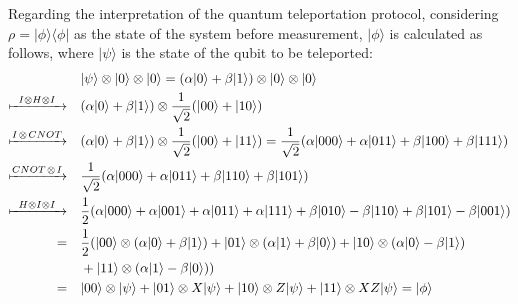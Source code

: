 Regarding the interpretation of the quantum teleportation protocol, considering $\rho = |\phi\rangle \langle \phi|$ as the state of the system before measurement, $|\phi\rangle$  is calculated as follows, where $|\psi\rangle$ is the state of the qubit to be teleported:
\begin{equation}  \label{eq:teleport_1}
  \begin{split}
&  |\psi\rangle \otimes |0\rangle \otimes |0\rangle = ( \alpha|0\rangle + \beta|1\rangle) \otimes |0\rangle \otimes |0\rangle  \\
\xmapsto{ \hspace{5pt} I\otimes H \otimes I  \hspace{5pt}} \quad &  ( \alpha|0\rangle + \beta|1\rangle) \otimes \frac{1}{\sqrt{2}} (|00\rangle + |10\rangle )  \\
\xmapsto{I \hspace{1pt} \otimes \hspace{1pt} CNOT} \quad & ( \alpha|0\rangle + \beta|1\rangle) \otimes \frac{1}{\sqrt{2}} (|00\rangle + |11\rangle ) = \frac{1}{\sqrt{2}} (\alpha|000\rangle + \alpha|011\rangle + \beta|100\rangle + \beta|111\rangle)\\
\xmapsto{ CNOT \hspace{1pt} \otimes \hspace{1pt} I } \quad &  \frac{1}{\sqrt{2}} (\alpha|000\rangle + \alpha|011\rangle + \beta|110\rangle + \beta|101\rangle)\\
 \xmapsto[]{\hspace{5pt} H \otimes I \otimes I \hspace{5pt}} \quad & \frac{1}{2} (\alpha |000\rangle +\alpha |001\rangle +  \alpha|011\rangle + \alpha|111\rangle + \beta|010\rangle - \beta|110\rangle + \beta|101\rangle - \beta|001\rangle )  \\
 = \quad & \frac{1}{2} (|00\rangle \otimes (\alpha |0\rangle + \beta|1\rangle ) + |01\rangle \otimes (\alpha |1\rangle + \beta|0\rangle) + |10\rangle \otimes (\alpha |0\rangle - \beta|1\rangle )   \\
  & + |11\rangle \otimes (\alpha |1\rangle - \beta|0\rangle)) \\
 = \quad & |00\rangle \otimes |\psi\rangle  + |01\rangle \otimes X|\psi\rangle + |10\rangle \otimes Z |\psi\rangle + |11\rangle \otimes XZ|\psi\rangle = |\phi\rangle  \\
  \end{split}
\end{equation}

